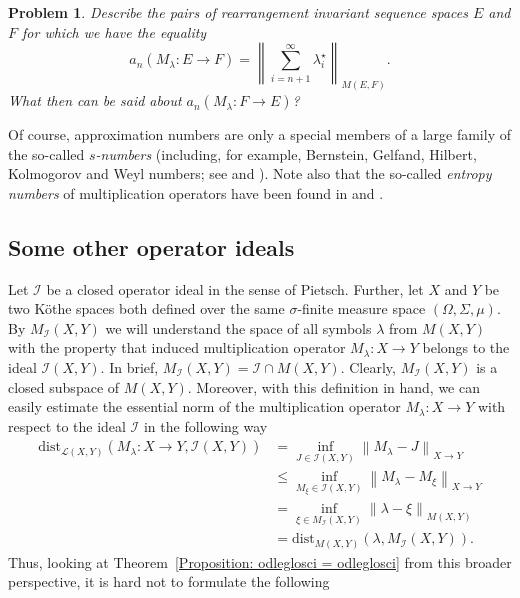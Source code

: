 \documentclass[11pt]{amsart}
\theoremstyle{definition}
\theoremstyle{definition}
\theoremstyle{definition}
\theoremstyle{definition}
\theoremstyle{definition}
\theoremstyle{definition}
\theoremstyle{definition}
\theoremstyle{definition}
\numberwithin{equation}{section}
\numberwithin{equation}{section}
\numberwithin{equation}{section}
\theoremstyle{definition}
\theoremstyle{definition}
\theoremstyle{definition}
\theoremstyle{definition}
\theoremstyle{definition}
\theoremstyle{definition}
\newtheorem{problem}[theorem]{Problem}
\newcommand{\norm}[1]{\left\lVert#1\right\rVert}
\begin{document}
	\begin{problem}
		{\it Describe the pairs of rearrangement invariant sequence spaces $E$ and $F$ for which we have the equality}
		\begin{equation*}
			a_n(M_{\lambda} \colon E \rightarrow F) = \norm{ \sum_{i=n+1}^{\infty} \lambda^{\star}_i }_{M(E,F)}.
		\end{equation*}
		{\it What then can be said about $a_n(M_{\lambda} \colon F \rightarrow E)$?}
	\end{problem}
	
	Of course, approximation numbers are only a special members of a large family of the so-called {\it $s$-numbers}
	(including, for example, Bernstein, Gelfand, Hilbert, Kolmogorov and Weyl numbers; see \cite[Section~7]{Pie74} and \cite{Pie80}).
	Note also that the so-called {\it entropy numbers} of multiplication operators have been found in \cite{Kuh05} and \cite{Sch84}.
	
\subsection{Some other operator ideals}

Let $\mathscr{I}$ be a closed operator ideal in the sense of Pietsch. Further, let $X$ and $Y$ be two K{\" o}the spaces
both defined over the same $\sigma$-finite measure space $(\Omega,\Sigma,\mu)$.
By $M_{\mathscr{I}}(X,Y)$ we will understand the space of all symbols $\lambda$ from $M(X,Y)$ with the property that induced
multiplication operator $M_{\lambda} \colon X \rightarrow Y$ belongs to the ideal $\mathscr{I}(X,Y)$.
In brief, $M_{\mathscr{I}}(X,Y) = \mathscr{I} \cap M(X,Y)$.
Clearly, $M_{\mathscr{I}}(X,Y)$ is a closed subspace of $M(X,Y)$.
Moreover, with this definition in hand, we can easily estimate the essential norm of the multiplication operator
$M_{\lambda} \colon X \rightarrow Y$ with respect to the ideal $\mathscr{I}$ in the following way
\begin{align*}
	\text{dist}_{\mathscr{L}(X,Y)}(M_{\lambda} \colon X \rightarrow Y,\mathscr{I}(X,Y))
	& = \inf\limits_{J \in \mathscr{I}(X,Y)} \norm{M_{\lambda} - J}_{X \rightarrow Y} \\
	& \leqslant \inf\limits_{M_{\xi} \in \mathscr{I}(X,Y)} \norm{M_{\lambda} - M_{\xi}}_{X \rightarrow Y} \\
	& = \inf\limits_{\xi \in M_{\mathscr{I}}(X,Y)} \norm{\lambda - \xi}_{M(X,Y)} \\
	& = \text{dist}_{M(X,Y)}(\lambda, M_{\mathscr{I}}(X,Y)).
\end{align*}
Thus, looking at Theorem~\ref{Proposition: odleglosci = odleglosci} from this broader perspective, it is hard not to formulate the following
\end{document}
